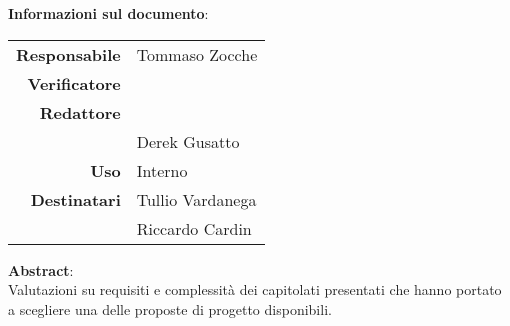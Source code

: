 \begin{center}
\textbf{Informazioni sul documento}: \\
\vspace{0.5cm}

\begin{tabular}{r|l}
    \textbf{Responsabile} &  Tommaso Zocche\\ 
    \textbf{Verificatore} &  \\ 
    \textbf{Redattore} &     \\ 
     &  Derek Gusatto   \\ 
    \textbf{Uso} & Interno\\ 
    \textbf{Destinatari} & Tullio Vardanega \\ & Riccardo Cardin \\ 
\end{tabular}

\vfill

\textbf{Abstract}: \\
\vspace{0.5cm}
Valutazioni su requisiti e complessità dei capitolati presentati che hanno portato a scegliere una delle proposte di progetto disponibili.
\end{center}


\bigskip